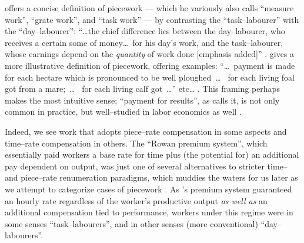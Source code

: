 \documentclass[trackingWork]{subfiles}
\begin{document}
\citeauthor{hughRaynbirdTaskWork} offers
a concise definition of piecework
--- which he variously also calls ``measure work'', ``grate work'', and ``task work'' ---
by contrasting the ``task--labourer'' with the ``day--labourer'':
``\dots the chief difference lies between the day--labourer,
who receives a certain some of money\dots~for his day's work,
and the task--labourer, whose earnings depend on the \textit{quantity} of work done [emphasis added]''
\cite{hughRaynbirdTaskWork}.
\citeauthor{10.2307/2338394} gives a more illustrative definition of piecework,
offering examples:
``\dots~payment is made for each hectare which is pronounced to be well ploughed~\dots~
for each living foal got from a mare;~\dots~
for each living calf got~\dots'' etc\dots
\cite{10.2307/2338394}.
This framing perhaps makes the most intuitive sense;
``payment for results'', as \citeauthor{10.2307/2338394} calls it,
is not only common in practice, but well--studied in labor economics as well
\cite{Figlio2007901,weitzman1976new,10.2307/3003414,BJIR:BJIR038}.

Indeed, we see work that adopts
piece--rate compensation in some aspects and
time--rate compensation in others.
The ``Rowan premium system'',
which essentially paid workers
a base rate for time plus
(the potential for) an additional pay dependent on output,
was just one of several alternatives to stricter time-- and piece--rate renumeration paradigms, which
muddies the waters for us later as we attempt to categorize cases of piecework
\cite{rowan1901premium}.
As \citeauthor{rowan1901premium}'s premium system guaranteed an hourly rate
regardless of the worker's productive output
\textit{as well as} an additional compensation tied to performance,
workers under this regime were in some senses ``task--labourers'',
and in other senses
(more conventional)
``day--labourers''.
\end{document}
